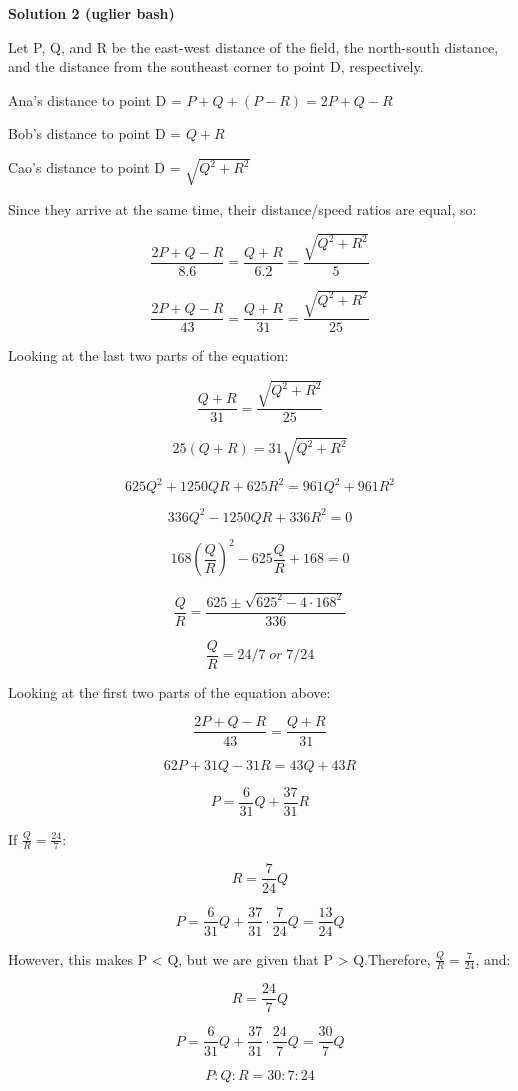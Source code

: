 \begin{enumerate}
\textbf{Solution 2 (uglier bash)}

Let P, Q, and R be the east-west distance of the field, the north-south distance, and the distance from the southeast corner to point D, respectively.

 Ana's distance to point D = $P + Q + (P - R) = 2P + Q - R$

 Bob's distance to point D = $Q + R$

 Cao's distance to point D = $\sqrt{Q^2 + R^2}$

 Since they arrive at the same time, their distance/speed ratios are equal, so:

 
 \[\frac{2P + Q - R}{8.6} = \frac{Q + R}{6.2} = \frac{\sqrt{Q^2 + R^2}}{5}\]

 \[\frac{2P + Q - R}{43} = \frac{Q + R}{31} = \frac{\sqrt{Q^2 + R^2}}{25}\]

 Looking at the last two parts of the equation:

 
 \[\frac{Q + R}{31} = \frac{\sqrt{Q^2 + R^2}}{25}\]

 \[25 (Q + R) = 31 \sqrt{Q^2 + R^2}\]

 \[625 Q^2 + 1250 QR + 625 R^2 = 961 Q^2 + 961 R^2\]

 \[336 Q^2 - 1250 QR + 336 R^2 = 0\]

 \[168 (\frac{Q}{R})^2 - 625 \frac{Q}{R}+ 168 = 0\]

 \[\frac{Q}{R} = \frac{625 \pm \sqrt{625^2 - 4 \cdot 168^2}}{336}\]

 \[\frac{Q}{R} = 24/7\;or\;7/24\]

 Looking at the first two parts of the equation above:

 
 \[\frac{2 P + Q - R}{43} = \frac{Q + R}{31}\]

 \[62 P + 31 Q - 31 R = 43 Q + 43 R\]

 \[P = \frac{6}{31}Q + \frac{37}{31} R\]

 If $\frac{Q}{R} = \frac{24}{7}$:

 
 \[R = \frac{7}{24} Q\]

 \[P = \frac{6}{31} Q + \frac{37}{31} \cdot \frac{7}{24} Q = \frac{13}{24} Q\]

 However, this makes P < Q, but we are given that P > Q.Therefore, $\frac{Q}{R} = \frac{7}{24}$, and:

 
 \[R = \frac{24}{7} Q\]

 \[P = \frac{6}{31} Q + \frac{37}{31} \cdot \frac{24}{7} Q = \frac{30}{7} Q\]

 \[P : Q : R = 30 : 7 : 24\]


\end{enumerate}

